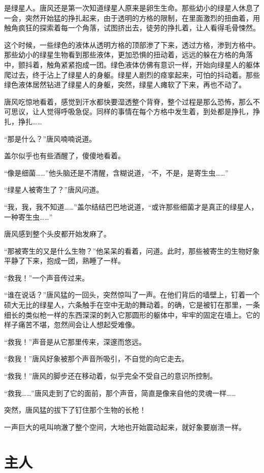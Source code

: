 是绿星人。唐风还是第一次知道绿星人原来是卵生生命。那些幼小的绿星人休息了一会，突然开始猛的挣扎起来，由于透明的方格的限制，在里面激烈的扭曲着，用触角疯狂的探索着每一个角落，试图挤出去，徒劳的挣扎着，让人看得毛骨悚然。

这个时候，一些绿色的液体从透明方格的顶部渗了下来，透过方格，渗到方格中。那些幼小的绿星生物看到那些液体，更加恐惧的扭动着，远远的躲在方格的角落中，颤抖着，触角紧紧抱成一团。绿色液体仿佛有意识一样，开始向绿星人的躯体爬过去，终于沾上了绿星人的身躯。绿星人剧烈的痉挛起来，可怕的抖动着。那些绿色液体居然钻进了绿星人的身躯，突然，绿星人瘫软了下来，再也不动了。

唐风吃惊地看着，感觉到汗水都快要湿透整个背脊，整个过程是那么恐怖，那么不可思议，让人觉得呼吸急促。同样的事情在每个方格中发生着，到处都是挣扎，挣扎，挣扎……

“那是什么？”唐风喃喃说道。

盖尔似乎也有些酒醒了，傻傻地看着。

“像是细菌……”他头脑还是不清醒，含糊说道，“不，不是，是寄生虫……”

“绿星人被寄生了？”唐风问道。

“我，我，我不知道……”盖尔结结巴巴地说道，“或许那些细菌才是真正的绿星人，一种寄生虫……”

唐风感到整个头皮都开始发麻了。

“那被寄生的又是什么生物？”他呆呆的看着，问道。此时，那些被寄生的生物好象平静了下来，抱成一团，熟睡了一样。

“救我！”一个声音传过来。

“谁在说话？”唐风猛的一回头，突然惊叫了一声。在他们背后的墙壁上，钉着一个硕大无比的绿星人，六条触手在空中无助的舞动着。的确，它是被钉在那里，一条细长的类似枪一样的东西深深的刺入它那圆形的躯体中，牢牢的固定在墙上。它的样子痛苦不堪，忽然间会让人想起受难像。

“救我！”声音是从它那里传来，深邃而悠远。

“救我！”唐风好象被那个声音所吸引，不自觉的向它走去。

“救我！”唐风的脚步还在移动着，似乎完全不受自己的意识所控制。

“救我……”唐风走到了它的面前，那个声音，简直是像来自他的灵魂一样……

突然，唐风猛的拔下了钉住那个生物的长枪！

一声巨大的吼叫响澈了整个空间，大地也开始震动起来，就好象要崩溃一样。

\chapter{主人}


